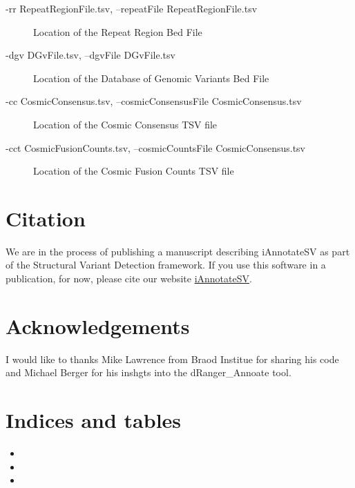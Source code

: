 \documentclass[letterpaper,10pt,english]{sphinxmanual}
\begin{document}
\begin{description}
\begin{description}
\item[{-rr RepeatRegionFile.tsv, --repeatFile RepeatRegionFile.tsv}] \leavevmode
Location of the Repeat Region Bed File

\item[{-dgv DGvFile.tsv, --dgvFile DGvFile.tsv}] \leavevmode
Location of the Database of Genomic Variants Bed File

\item[{-cc CosmicConsensus.tsv, --cosmicConsensusFile CosmicConsensus.tsv}] \leavevmode
Location of the Cosmic Consensus TSV file

\item[{-cct CosmicFusionCounts.tsv, --cosmicCountsFile CosmicConsensus.tsv}] \leavevmode
Location of the Cosmic Fusion Counts TSV file

\end{description}

\end{description}


\chapter{Citation}
\label{index:citation}
We are in the process of publishing a manuscript describing iAnnotateSV as part of the Structural Variant Detection framework.
If you use this software in a publication, for now, please cite our website \href{http://github.com/rhshah/iAnnotateSV}{iAnnotateSV}.


\chapter{Acknowledgements}
\label{index:acknowledgements}
I would like to thanks Mike Lawrence from Braod Institue for sharing his code and Michael Berger for his inshgts into the dRanger\_Annoate tool.


\chapter{Indices and tables}
\label{index:indices-and-tables}\begin{itemize}
\item {} 

\item {} 

\item {} 

\end{itemize}



\renewcommand{\indexname}{Index}
\printindex
\end{document}
